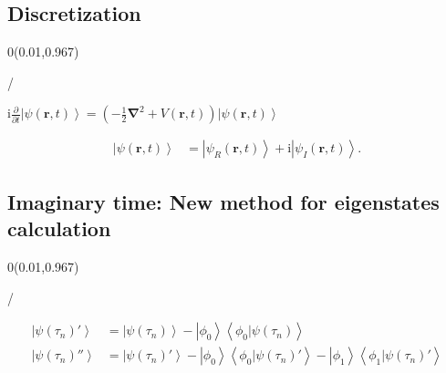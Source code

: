 \documentclass{beamer}
\makeatletter
\newcommand{\framenumber}{
\begin{textblock}{0}(0.01,0.967)
\begin{scriptsize}
{\color{gray}\insertframenumber/\inserttotalframenumber}
\end{scriptsize}
\end{textblock}
}
\newcommand{\im}{\textrm{i}}
\newcommand{\vecnabla}{\bm{\nabla}}
\newcommand{\laplacien}[1]{\vecnabla^2 #1}
\newcommand{\del}{\partial}                                     %
\newcommand{\delt}[1]{\frac{\del #1}{\del t}}                   %
\newcommand{\ve}[1]{\textbf{#1}}
\newcommand{\vecr}{\ve{r}}
\newcommand{\pa}[1]{\left( #1 \right)}
\newcommand{\ket}[1]{\left| #1 \right>}
\newcommand{\crossp}[2]{\left< #1 \left| #2 \right.\right>}
\makeatother
\begin{document}
\subsection{Discretization}
\begin{frame}{}\framenumber
\begin{center}
$\im \delt{} \ket{ \psi\pa{\vecr,t} } = \pa{ - \frac{1}{2} \laplacien{} + V\pa{\vecr,t} } \ket{ \psi\pa{\vecr,t} }$

\begin{align}
\ket{ \psi\pa{\vecr,t} } & =        \ket{ \psi_R\pa{\vecr,t} }
                            + \im \ket{ \psi_I\pa{\vecr,t} } .
\end{align}

\end{center}
\end{frame}

\subsection{Imaginary time: New method for eigenstates calculation}
\begin{frame}{}\framenumber
\begin{center}
\begin{align}
\ket{ \psi\pa{\tau_n}' } & = \ket{ \psi\pa{\tau_n} }
                        - \ket{\phi_0} \crossp{\phi_0}{\psi\pa{\tau_n}} \\
\ket{ \psi\pa{\tau_n}'' } & = \ket{ \psi\pa{\tau_n}' }
                        - \ket{\phi_0} \crossp{\phi_0}{\psi\pa{\tau_n}'}
                        - \ket{\phi_1} \crossp{\phi_1}{\psi\pa{\tau_n}'}
\end{align}
\end{center}
\end{frame}
\end{document}
